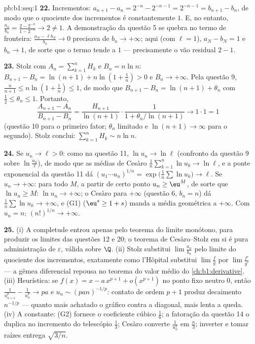 \begin{solution}{pb:b1:seq:1}
\textbf{22.} Incrementos: $a_{n+1} - a_n = 2^{-n} - 2^{-n-1} =
2^{-n-1} = b_{n+1} - b_n$, de modo que o quociente dos incrementos é
constantemente $1$. E, no entanto, $\frac{a_n}{b_n} = \frac{2 - 2^{-n}}{1 -
2^{-n}} \to 2 \neq 1$. A demonstração da questão 5 se quebra no
termo de fronteira: $\frac{a_N - \ell b_N}{b_n} \to 0$ precisava de $b_n
\to +\infty$; aqui (com $\ell = 1$), $a_N - b_N = 1$ e $b_n
\to 1$, de sorte que o termo tende a $1$ --- precisamente o vão
residual $2 - 1$.

\textbf{23.} Stolz com $A_n = \sum_{k=1}^n H_k$ e $B_n = n\ln
n$: $B_{n+1} - B_n = \ln(n+1) + n\ln(1 + \frac1n) > 0$ e $B_n
\to +\infty$. Pela questão 9, $\frac{n}{n+1} \leq n\ln(1 +
\frac1n) \leq 1$, de modo que $B_{n+1} - B_n = \ln(n+1) + \theta_n$ com
$\frac12 \leq \theta_n \leq 1$. Portanto,
\[
\frac{A_{n+1} - A_n}{B_{n+1} - B_n}
= \frac{H_{n+1}}{\ln(n+1)}\cdot
\frac{1}{1 + \theta_n/\ln(n+1)} \longrightarrow 1 \cdot 1 = 1
\]
(questão 10 para o primeiro fator; $\theta_n$ limitado e
$\ln(n+1) \to \infty$ para o segundo). Stolz conclui:
$\sum_{k=1}^n H_k \sim n\ln n$.

\textbf{24.} Se $u_n \to \ell > 0$: como na questão 11, $\ln u_n
\to \ln\ell$ (confronto da questão 9 sobre $\ln\frac{u_n}{\ell}$), de
modo que as médias de Cesàro $\frac1n\sum_{k=1}^n \ln u_k \to \ln\ell$,
e a ponte exponencial da questão 11 dá $(u_1\cdots
u_n)^{1/n} = \exp\bigl(\frac1n\sum\ln u_k\bigr) \to \ell$. Se
$u_n \to +\infty$: para todo $M$, a partir de certo ponto $u_n \geq \eu^M$, de sorte que $\ln u_n \geq M$: $\ln u_n \to +\infty$; o Cesàro
para $+\infty$ (questão 6, $b_n = n$) dá $\frac1n\sum \ln u_k \to
+\infty$, e (G1) ($\eu^s \geq 1 + s$) manda a média geométrica
a $+\infty$. Com $u_n = n$: $(n!)^{1/n} \to +\infty$.

\textbf{25.} (i) A completude entrou apenas pelo teorema do limite
monótono, para produzir os limites das questões 12 e 20;
o teorema de Cesàro--Stolz em si é pura administração de
$\varepsilon$, válida sobre $\Q$. (ii) Stolz substitui
$\lim \frac{a_n}{b_n}$ pelo limite do quociente dos incrementos,
exatamente como l'Hôpital substitui $\lim\frac fg$ por
$\lim\frac{f'}{g'}$ --- a gêmea diferencial repousa no teorema do valor
médio do \cref{ch:b1:derivative}. (iii) Heurística: se
$f(x) = x - a\,x^{p+1} + o(x^{p+1})$ no ponto fixo neutro
$0$, então $\frac{1}{u_{n+1}^p} - \frac{1}{u_n^p} \to pa$ e
$u_n \sim (pan)^{-1/p}$: contato de ordem $p + 1$ produz decaimento
$n^{-1/p}$ --- quanto mais achatado o gráfico contra a diagonal, mais
lenta a queda. (iv) A constante: (G2) fornece o coeficiente
cúbico $\frac16$; a fatoração da questão 14 o duplica no
incremento do telescópio $\frac13$; Cesàro converte
$\frac{1}{u_n^2}$ em $\frac n3$; inverter e tomar raízes
entrega $\sqrt{3/n}$.
\end{solution}
